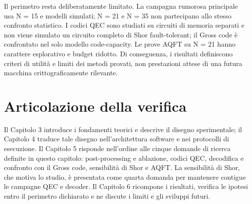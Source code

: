 Il perimetro resta deliberatamente limitato. La campagna rumorosa principale usa N = 15 e modelli simulati; N = 21 e N = 35 non partecipano allo stesso confronto statistico. I codici QEC sono studiati su circuiti di memoria separati e non viene simulato un circuito completo di Shor fault-tolerant; il Gross code è confrontato nel solo modello code-capacity. Le prove AQFT su N = 21 hanno carattere esplorativo e budget ridotto. Di conseguenza, i risultati definiscono criteri di utilità e limiti dei metodi provati, non prestazioni attese di una futura macchina crittograficamente rilevante. \cite{googleQECBelowThreshold2025,alphaqubit2024,gidney2021,aharonov1997fault}

\section{Articolazione della verifica}\label{sec:finale_2_8}

Il Capitolo 3 introduce i fondamenti teorici e descrive il disegno sperimentale; il Capitolo 4 traduce tale disegno nell'architettura software e nei protocolli di esecuzione. Il Capitolo 5 risponde nell'ordine alle cinque domande di ricerca definite in questo capitolo: post-processing e ablazione, codici QEC, decodifica e confronto con il Gross code, sensibilità di Shor e AQFT. La sensibilità di Shor, che motiva lo studio, è presentata come quarta domanda per mantenere contigue le campagne QEC e decoder. Il Capitolo 6 ricompone i risultati, verifica le ipotesi entro il perimetro dichiarato e ne discute i limiti e gli sviluppi futuri.
